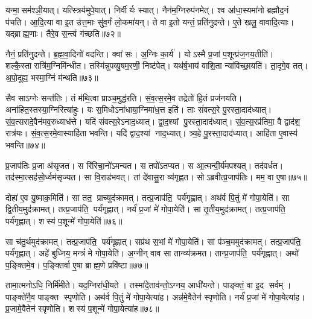यन्मा॒सम॑श्ञी॒यात्।
यत्स्त्रिय॑मुपे॒यात्।
निर्वीर्यः स्यात्।
नैन॑म॒ग्निरुप॑नमेत्।
श्व आ॑धा॒स्यमा॑नो ब्रह्मौद॒नं प॑चति।
आ॒दि॒त्या वा इ॒त उ॑त्त॒माः सु॑व॒र्गं लो॒कमा॑यन्।
ते वा इ॒तो यन्तं॒ प्रति॑नुदन्ते।
ए॒ते खलु॒ वावादि॒त्याः।
यद्ब्राह्म॒णाः।
तैरे॒व स॒न्त्वं ग॑च्छति॥७२॥

नैनं॒ प्रति॑नुदन्ते।
ब्र॒ह्म॒वा॒दिनो॑ वदन्ति।
क्वा॑ सः।
अ॒ग्निः का॒र्य॑।
योऽस्मै प्र॒जां प॒शून्प्र॑ज॒नय॒तीति॑।
शल्कै॒स्तारात्रि॑म॒ग्निमि॑न्धीत।
तस्मि॑न्नुपव्यु॒षम॒रणी॒ निष्ट॑पेत्।
यथ॑र्\mbox{}ष॒भाय॑ वाशि॒ता न्या॑विच्छा॒यति॑।
ता॒दृगे॒व तत्।
अ॒पो॒दूह्य॒ भस्मा॒ग्निं म॑न्थति॥७३॥

सैव साऽग्नेः सन्त॑तिः।
तं म॑थि॒त्वा प्राञ्च॒मुद्ध॑रति।
सं॒व॒त्स॒रमे॒व तद्रेतो॑ हि॒तं प्रज॑नयति।
अना॑हित॒स्तस्या॒ग्निरित्या॑हुः।
यः स॒मिधोऽना॑धाया॒ग्निमा॑ध॒त्त इति॑।
ताः सं॑वत्स॒रे पु॒रस्ता॒दाद॑ध्यात्।
सं॒व॒त्सरादे॒वैन॑मव॒रुध्याध॑त्ते।
यदि॑ संवत्स॒रेऽनाद॒ध्यात्।
द्वा॒द॒श्यां पु॒रस्ता॒दाद॑ध्यात्।
सं॒व॒त्स॒रप्र॑तिमा॒ वै द्वाद॑श॒ रात्र॑यः।
सं॒व॒त्स॒रमे॒वास्याहि॑ता भवन्ति।
यदि॑ द्वाद॒श्यां नाद॒ध्यात्।
त्र्य॒हे पु॒रस्ता॒दाद॑ध्यात्।
आहि॑ता ए॒वास्य॑ भवन्ति॥७४॥

प्र॒जाप॑तिः प्र॒जा अ॑सृजत।
स रि॑रिचा॒नो॑ऽमन्यत।
स तपो॑ऽतप्यत।
स आ॒त्मन्वी॒र्य॑मपश्यत्।
तद॑वर्धत।
तद॑स्मा॒त्सह॑सो॒र्ध्वम॑सृज्यत।
सा वि॒राड॑भवत्।
तां दे॑वासु॒रा व्य॑गृह्णत।
सोऽब्रवीत्प्र॒जाप॑तिः।
मम॒ वा ए॒षा॥७५॥

दोहा॑ ए॒व यु॒ष्माक॒मिति॑।
सा तत॒ प्राच्युद॑क्रामत्।
तत्प्र॒जाप॑ति॒ पर्य॑गृह्णात्।
अथ॑र्व पि॒तुं मे॑ गोपा॒येति॑।
सा द्वि॒तीय॒मुद॑क्रामत्।
तत्प्र॒जाप॑ति॒ पर्य॑गृह्णात्।
नर्य॑ प्र॒जां मे॑ गोपा॒येति॑।
सा तृ॒तीय॒मुद॑क्रामत्।
तत्प्र॒जाप॑ति॒ पर्य॑गृह्णात्।
शस्य॑ प॒शून्मे॑ गोपा॒येति॑॥७६॥

सा च॑तु॒र्थमुद॑क्रामत्।
तत्प्र॒जाप॑ति॒ पर्य॑गृह्णात्।
सप्र॑थ स॒भां मे॑ गोपा॒येति॑।
सा प॑ञ्च॒ममुद॑क्रामत्।
तत्प्र॒जाप॑ति॒ पर्य॑गृह्णात्।
अहे॑ बुध्निय॒ मन्त्रं॑ मे गोपा॒येति॑।
अ॒ग्नीन् वाव सा तान्व्य॑क्रमत।
तान्प्र॒जाप॑ति॒ पर्य॑गृह्णात्।
अथो॑ प॒ङ्क्तिमे॒व।
प॒ङ्क्तिर्वा ए॒षा ब्राह्म॒णे प्रवि॑ष्टा॥७७॥

तामा॒त्मनोऽधि॒ निर्मि॑मीते।
यद॒ग्निरा॑धी॒यते।
तस्मा॑दे॒ताव॑न्तो॒\-ऽग्नय॒ आधी॑यन्ते।
पाङ्क्तं॒ वा इ॒द सर्वम्।
पाङ्क्ते॑नै॒व पाङ्क्त स्पृणोति।
अथ॑र्व पि॒तुं मे॑ गोपा॒येत्या॑ह।
अन्न॑मे॒वैतेन॑ स्पृणोति।
नर्य॑ प्र॒जां मे॑ गोपा॒येत्या॑ह।
प्र॒जामे॒वैतेन॑ स्पृणोति।
शस्य॑ प॒शून्मे॑ गोपा॒येत्या॑ह॥७८॥

